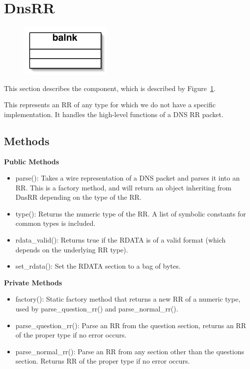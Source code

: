 \section{DnsRR}\label{sec:dnsrr}

\begin{figure}
\begin{center}
\includegraphics[width=0.4\textwidth]{figs/blank}
\end{center}
\caption{}
\label{fig:dnsrr}
\end{figure}

This section describes the component, which is described by Figure~\ref{fig:dnsrr}.  

This represents an RR of any type for which we do not have a specific implementation. It handles the high-level functions of a DNS RR packet.

\subsection{Methods}

{\bf Public Methods}
\begin{itemize}
\item parse(): Takes a wire representation of a DNS packet and parses it into an RR. This is a factory method, and will return an object inheriting from DnsRR depending on the type of the RR.
\item type(): Returns the numeric type of the RR. A list of symbolic constants for common types is included.
\item rdata\_valid(): Returns true if the RDATA is of a valid format (which depends on the underlying RR type).
\item set\_rdata(): Set the RDATA section to a bag of bytes.
\end{itemize}

{\bf Private Methods}
\begin{itemize}
\item factory(): Static factory method that returns a new RR of a numeric type, used by parse\_question\_rr() and parse\_normal\_rr().
\item parse\_question\_rr(): Parse an RR from the question section, returns an RR of the proper type if no error occurs.
\item parse\_normal\_rr(): Parse an RR from any section other than the questions section. Returns RR of the proper type if no error occurs.
\end{itemize}

